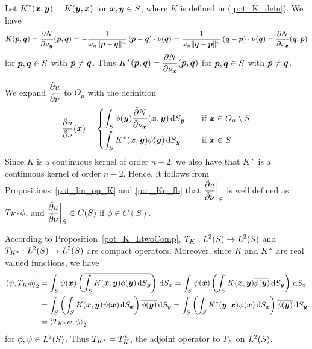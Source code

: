 Let $\displaystyle K^\ast({\bm{x}},{\bm{y}}) = K({\bm{y}},{\bm{x}})$
for ${\bm{x}},{\bm{y}} \in S$,  where $K$ is defined in
(\ref{pot_K_defn}).  We have
\[
K({\bm{p}},{\bm{q}}) = \frac{\partial{N}}{\partial \nu_{{\bm{y}}}}({\bm{p}},{\bm{q}})
= - \frac{1}{\omega_n \|{\bm{p}}-{\bm{q}}\|^n}\,({\bm{p}}-{\bm{q}})\cdot
\nu({\bm{q}})
= \frac{1}{\omega_n \|{\bm{q}}-{\bm{p}}\|^n}\,({\bm{q}}-{\bm{p}})\cdot
\nu({\bm{q}})
= \frac{\partial{N}}{\partial \nu_{{\bm{x}}}}({\bm{q}},{\bm{p}})
\]
for ${\bm{p}} , {\bm{q}} \in S$ with ${\bm{p}} \neq {\bm{q}}$.  Thus
$\displaystyle K^\ast({\bm{p}},{\bm{q}}) =
\frac{\partial{N}}{\partial \nu_{{\bm{x}}}}({\bm{p}},{\bm{q}})$ for
${\bm{p}} , {\bm{q}} \in S$ with ${\bm{p}} \neq {\bm{q}}$.

We expand $\displaystyle \frac{\tilde{\partial}{u}}{\tilde{\partial}{\nu}}$ to $O_\mu$ with
the definition
\begin{equation} \label{pot_dslp_def}
\frac{\tilde{\partial}{u}}{\tilde{\partial}{\nu}}({\bm{x}}) = 
\begin{cases}
\displaystyle
\int_S \phi({\bm{y}}) \frac{\tilde{\partial}{N}}{\tilde{\partial}{\nu_{{\bm{x}}}}}({\bm{x}},{\bm{y}})
\,\mathrm{d}{S}_{{\bm{y}}} & \quad \text{if} \ {\bm{x}} \in O_\mu \setminus S \\[0.8em]
\displaystyle
\int_S K^\ast({\bm{x}},{\bm{y}}) \phi({\bm{y}})
\,\mathrm{d}{S}_{{\bm{y}}} & \quad \text{if} \ {\bm{x}} \in S
\end{cases}
\end{equation}
Since $K$ is a continuous kernel of order $n-2$, we also have that
$\displaystyle K^\ast$ is 
a continuous kernel of order $n-2$.  Hence, it follows from
Propositions~\ref{pot_lin_op_K} and \ref{pot_Kc_fb} that
$\displaystyle \frac{\tilde{\partial}{u}}{\tilde{\partial}{\nu}} \bigg|_S$ is well defined as
$\displaystyle T_{K^\ast} \phi$, and
$\displaystyle \frac{\tilde{\partial}{u}}{\tilde{\partial}{\nu}}\bigg|_S \in C(S)$ if $\phi\in C(S)$.

According to Proposition~\ref{pot_K_LtwoComp},
$\displaystyle T_K:L^2(S)\rightarrow L^2(S)$ and
$\displaystyle T_{K^\ast}:L^2(S)\rightarrow L^2(S)$ are
compact operators.  Moreover, since $K$ and $\displaystyle K^\ast$ are
real valued functions, we have
\begin{align*}
\left\langle{\psi} , {T_K\phi}\right\rangle_2 &= \int_S \psi({\bm{x}}) \left(
\overline{\int_S K({\bm{x}},{\bm{y}})\phi({\bm{y}}) \,\mathrm{d}{S}_{{\bm{y}}}} \right) \,\mathrm{d}{S}_{{\bm{x}}}
=\int_S \psi({\bm{x}}) \left(
\int_S K({\bm{x}},{\bm{y}})\overline{\phi({\bm{y}})} \,\mathrm{d}{S}_{{\bm{y}}} \right)
\,\mathrm{d}{S}_{{\bm{x}}} \\
&=\int_S \left( \int_S K({\bm{x}},{\bm{y}}) \psi({\bm{x}}) \,\mathrm{d}{S}_{{\bm{x}}}
\right) \overline{\phi({\bm{y}})} \,\mathrm{d}{S}_{{\bm{y}}}
=\int_S \left(
\int_S K^\ast({\bm{y}},{\bm{x}}) \psi({\bm{x}}) \,\mathrm{d}{S}_{{\bm{x}}}
\right) \overline{\phi({\bm{y}})} \,\mathrm{d}{S}_{{\bm{y}}} \\
&= \left\langle{T_{K^\ast} \psi} , {\phi}\right\rangle_2
\end{align*}
for $\displaystyle \phi,\psi \in L^2(S)$.
Thus $\displaystyle T_{K^\ast} = T_K^\ast$, the adjoint operator to $T_K$ on
$\displaystyle L^2(S)$.

